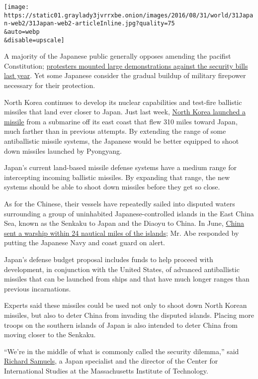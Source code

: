 \texttt{[image: https://static01.graylady3jvrrxbe.onion/images/2016/08/31/world/31Japan-web2/31Japan-web2-articleInline.jpg?quality=75\\\&auto=webp\\\&disable=upscale]}

A majority of the Japanese public generally opposes amending the
pacifist Constitution;
\href{http://www.nytimes3xbfgragh.onion/2015/07/17/world/asia/japans-lower-house-passes-bills-giving-military-freer-hand-to-fight.html}{protesters
mounted large demonstrations against the security bills last year}. Yet
some Japanese consider the gradual buildup of military firepower
necessary for their protection.

North Korea continues to develop its nuclear capabilities and test-fire
ballistic missiles that land ever closer to Japan. Just last week,
\href{http://www.nytimes3xbfgragh.onion/2016/08/25/world/asia/japan-china-korea-missile-test.html}{North
Korea launched a missile} from a submarine off its east coast that flew
310 miles toward Japan, much farther than in previous attempts. By
extending the range of some antiballistic missile systems, the Japanese
would be better equipped to shoot down missiles launched by Pyongyang.

Japan's current land-based missile defense systems have a medium range
for intercepting incoming ballistic missiles. By expanding that range,
the new systems should be able to shoot down missiles before they get so
close.

As for the Chinese, their vessels have repeatedly sailed into disputed
waters surrounding a group of uninhabited Japanese-controlled islands in
the East China Sea, known as the Senkaku to Japan and the Diaoyu to
China. In June,
\href{http://www.nytimes3xbfgragh.onion/2016/06/10/world/asia/japan-china-navy-protest.html}{China
sent a warship within 24 nautical miles of the islands}; Mr. Abe
responded by putting the Japanese Navy and coast guard on alert.

Japan's defense budget proposal includes funds to help proceed with
development, in conjunction with the United States, of advanced
antiballistic missiles that can be launched from ships and that have
much longer ranges than previous incarnations.

Experts said these missiles could be used not only to shoot down North
Korean missiles, but also to deter China from invading the disputed
islands. Placing more troops on the southern islands of Japan is also
intended to deter China from moving closer to the Senkaku.

``We're in the middle of what is commonly called the security dilemma,''
said
\href{http://web.mit.edu/polisci/people/faculty/richard-samuels.html}{Richard
Samuels}, a Japan specialist and the director of the Center for
International Studies at the Massachusetts Institute of Technology.

